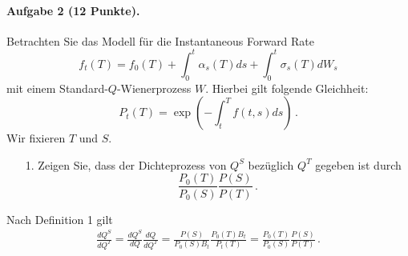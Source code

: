 \documentclass{article}
\begin{document}
\paragraph{Aufgabe 2 \textnormal{(12 Punkte)}.}
Betrachten Sie das Modell für die Instantaneous Forward Rate
\[
  f_t(T)=f_0(T)+\int_0^t\alpha_s(T)ds+\int_0^t\sigma_s(T)dW_s
\]
mit einem Standard-$Q$-Wienerprozess $W$.
Hierbei gilt folgende Gleichheit:
\[
  P_t(T)=\operatorname{exp}\left({-}\int_t^Tf(t,s)ds\right)\,.
\]
Wir fixieren $T$ und $S$.
\begin{itemize}
\item [1.] Zeigen Sie, dass der Dichteprozess von $Q^S$ bezüglich $Q^T$ gegeben ist durch
\[
  \frac{P_0(T)}{P_0(S)}\frac{P(S)}{P(T)}\,.
\]
\end{itemize}

Nach Definition 1 gilt
\begin{align*}
  \frac{d Q^S}{d Q^T}=\frac{d Q^S}{d Q}\frac{dQ}{dQ^T}
  =\frac{P(S)}{P_0(S)B_t}\frac{P_0(T)B_t}{P_t(T)}=\frac{P_0(T)}{P_0(S)}\frac{P(S)}{P(T)}\,.
\end{align*}


%
\end{document}
